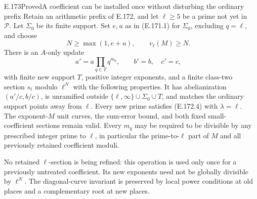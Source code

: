 \begin{result}{E.173}{Proved}{A coefficient can be installed once without disturbing the ordinary prefix}
Retain an arithmetic prefix of E.172, and let
\(\ell\ge5\) be a prime not yet in \(\mathcal P\).
Let \(\Sigma_0\) be its finite support. Set \(e,u\) as in
(E.171.1) for \(\Sigma_0\), excluding \(q=\ell\), and choose
\[
             N\ge\max(1,e+u),\qquad v_\ell(M)\ge N.
 \tag{E.173.1}
\]
There is an \(A\)-only update
\[
                 a'=a\prod_{q\in T}q^{m_q},\qquad b'=b,\quad c'=c,
 \tag{E.173.2}
\]
with finite new support \(T\), positive integer exponents,
and a finite class-two section \(s_\ell\) modulo \(\ell^N\)
with the following properties. It has abelianization
\((a'/c,b/c)\), is unramified outside
\(\{\ell,\infty\}\cup\Sigma_0\cup T\), and matches the
ordinary support points away from \(\ell\).
Every new prime satisfies (E.172.4) with \(\lambda=\ell\).
The exponent-\(M\) unit curves, the sum-error bound, and both
fixed small-coefficient sections remain valid.
Every \(m_q\) may be required to be divisible by any prescribed
integer prime to \(\ell\), in particular the prime-to-\(\ell\)
part of \(M\) and all previously retained coefficient moduli.

No retained \(\ell\)-section is being refined: this operation
is used only once for a previously untreated coefficient.
Its new exponents need not be globally divisible by \(\ell^N\).
The diagonal-curve invariant is preserved by local power
conditions at old places and a complementary root at new places.
\end{result}
